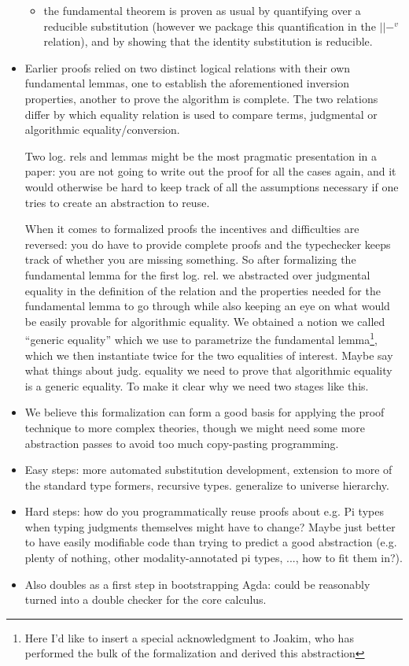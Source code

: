 \documentclass{book}
\begin{document}
\begin{itemize}
\begin{itemize}
   \item the fundamental theorem is proven as usual by quantifying over a
   reducible substitution (however we package this quantification in
   the $||-^v$ relation), and by showing that the identity substitution
   is reducible.
   \end{itemize}

 \item Earlier proofs relied on two distinct logical relations with their
 own fundamental lemmas, one to establish the aforementioned inversion
 properties, another to prove the algorithm is complete.
 The two relations differ by which equality relation is used to
 compare terms, judgmental or algorithmic equality/conversion.

 Two log. rels and lemmas might be the most pragmatic presentation in
 a paper: you are not going to write out the proof for all the cases
 again, and it would otherwise be hard to keep track of all the
 assumptions necessary if one tries to create an abstraction to reuse.

 When it comes to formalized proofs the incentives and difficulties
 are reversed: you do have to provide complete proofs and the
 typechecker keeps track of whether you are missing something. So
 after formalizing the fundamental lemma for the first log. rel. we
 abstracted over judgmental equality in the definition of the relation
 and the properties needed for the fundamental lemma to go through
 while also keeping an eye on what would be easily provable for
 algorithmic equality.  We obtained a notion we called ``generic
 equality'' which we use to parametrize the fundamental
 lemma\footnote{Here I'd like to insert a special acknowledgment to
   Joakim, who has performed the bulk of the formalization and derived
   this abstraction}, which we then instantiate twice for the two
 equalities of interest.
 Maybe say what things about judg. equality we need to prove that
   algorithmic equality is a generic equality. To make it clear why we need two stages like this.

 \item We believe this formalization can form a good basis for applying
 the proof technique to more complex theories, though we might need
 some more abstraction passes to avoid too much copy-pasting programming.

 \item Easy steps: more automated substitution development, extension to
 more of the standard type formers, recursive types. generalize to universe hierarchy.

 \item Hard steps: how do you programmatically reuse proofs about e.g. Pi
 types when typing judgments themselves might have to change? Maybe
 just better to have easily modifiable code than trying to predict a
 good abstraction (e.g. plenty of nothing, other modality-annotated pi types, ..., how to fit them in?).

 \item Also doubles as a first step in bootstrapping Agda: could be
 reasonably turned into a double checker for the core calculus.
\end{itemize}
\end{document}
